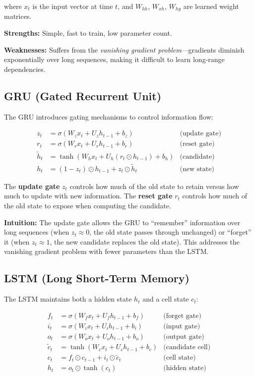 where $x_t$ is the input vector at time $t$, and $W_{hh}$, $W_{xh}$, $W_{hy}$ are learned weight matrices.

\textbf{Strengths:} Simple, fast to train, low parameter count.

\textbf{Weaknesses:} Suffers from the \emph{vanishing gradient problem}---gradients diminish exponentially over long sequences, making it difficult to learn long-range dependencies.

\subsection{GRU (Gated Recurrent Unit)}

The GRU introduces gating mechanisms to control information flow:

\begin{align}
z_t &= \sigma(W_z x_t + U_z h_{t-1} + b_z) & \text{(update gate)} \\
r_t &= \sigma(W_r x_t + U_r h_{t-1} + b_r) & \text{(reset gate)} \\
\tilde{h}_t &= \tanh(W_h x_t + U_h (r_t \odot h_{t-1}) + b_h) & \text{(candidate)} \\
h_t &= (1 - z_t) \odot h_{t-1} + z_t \odot \tilde{h}_t & \text{(new state)}
\end{align}

The \textbf{update gate} $z_t$ controls how much of the old state to retain versus how much to update with new information. The \textbf{reset gate} $r_t$ controls how much of the old state to expose when computing the candidate.

\textbf{Intuition:} The update gate allows the GRU to ``remember'' information over long sequences (when $z_t \approx 0$, the old state passes through unchanged) or ``forget'' it (when $z_t \approx 1$, the new candidate replaces the old state). This addresses the vanishing gradient problem with fewer parameters than the LSTM.

\subsection{LSTM (Long Short-Term Memory)}

The LSTM maintains both a hidden state $h_t$ and a cell state $c_t$:

\begin{align}
f_t &= \sigma(W_f x_t + U_f h_{t-1} + b_f) & \text{(forget gate)} \\
i_t &= \sigma(W_i x_t + U_i h_{t-1} + b_i) & \text{(input gate)} \\
o_t &= \sigma(W_o x_t + U_o h_{t-1} + b_o) & \text{(output gate)} \\
\tilde{c}_t &= \tanh(W_c x_t + U_c h_{t-1} + b_c) & \text{(candidate cell)} \\
c_t &= f_t \odot c_{t-1} + i_t \odot \tilde{c}_t & \text{(cell state)} \\
h_t &= o_t \odot \tanh(c_t) & \text{(hidden state)}
\end{align}

